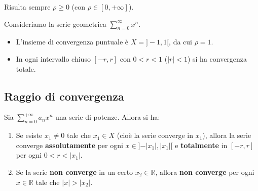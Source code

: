\begin{oss}
Risulta sempre $\rho \ge 0$ (con $\rho \in [0, +\infty]$).
\end{oss}

\begin{example}
Consideriamo la serie geometrica $\sum_{n=0}^{\infty} x^n$.
\begin{itemize}
    \item L'insieme di convergenza puntuale è $X = ]-1, 1[$, da cui $\rho = 1$.
    \item In ogni intervallo chiuso $[-r, r]$ con $0 < r < 1$ ($\vert r \vert < 1$) si ha convergenza totale.
\end{itemize}
\end{example}

\subsection{Raggio di convergenza}

\begin{theorem}
Sia $\sum_{n=0}^{+\infty} a_n x^n$ una serie di potenze. Allora si ha:
\begin{enumerate}
    \item[(i)] Se esiste $x_1 \neq 0$ tale che $x_1 \in X$ (cioè la serie converge in $x_1$), allora la serie converge \textbf{assolutamente} per ogni $x \in ]-\vert x_1 \vert, \vert x_1 \vert[$ e \textbf{totalmente} in $[-r, r]$ per ogni $0 < r < \vert x_1 \vert$.
    \item[(ii)] Se la serie \textbf{non converge} in un certo $x_2 \in \mathbb{R}$, allora \textbf{non converge} per ogni $x \in \mathbb{R}$ tale che $\vert x \vert > \vert x_2 \vert$.
\end{enumerate}
\end{theorem}

